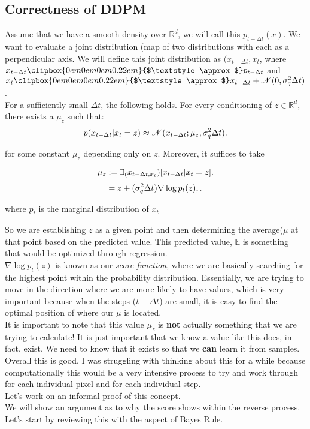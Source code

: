 \documentclass[10pt, oneside]{report}
\newcommand{\halfapprox}{\mathchoice{%
\clipbox{0em 0em 0em 0.22em}{$\displaystyle\approx$}}{%
\clipbox{0em 0em 0em 0.22em}{$\textstyle\approx$}}{%
\clipbox{0em 0em 0em 0.18em}{$\scriptstyle\approx$}}{%
\clipbox{0em 0em 0em 0.18em}{$\scriptscriptstyle\approx$}}}
\newcommand{\R}{\mathbb{R}}
\newcommand{\E}{\mathbb{E}}
\begin{document}
\subsection{Correctness of DDPM}
Assume that we have a smooth density over $\R^d$, we will call this $p_{t-\Delta t}(x)$.  We want to evaluate a joint distribution (map of two distributions with each as a perpendicular axis. We will define this joint distribution as $(x_{t-\Delta t}, x_t$, where $x_{t-\Delta t} \halfapprox p_{t-\Delta t}$ and $x_t \halfapprox x_{t-\Delta t} + \mathcal{N}(0, \sigma^2_q \Delta t)$.\\
For a sufficiently small $\Delta t$, the following holds. For every conditioning of $z \in \R^d$, there exists a $\mu_z$ such that:
\[
	p(x_{t-\Delta t} | x_t = z) \approx \mathcal{N}(x_{t-\Delta t}; \mu_z, \sigma^2_q \Delta t)\\
.\]
\begin{center}
    
	for some constant $\mu_z$ depending only on $z$.  Moreover, it suffices to take \\
\end{center}
\[
	\mu_z := \exists_(x_{t-\Delta t, x_t}) [x_{t-\Delta t} | x_t = z] \\
.\]
\[
	= z + (\sigma^2_q \Delta t) \nabla \log p_t (z), \\
.\]
\begin{center}
	where $p_t$ is the marginal distribution of $x_t$\\
\end{center}
So we are establishing $z$ as a given point and then determining the average($\mu$ at that point based on the predicted value.  This predicted value, $\E$ is something that would be optimized through regression.\\
$\nabla \log p_t (z)$ is known as our \textit{score function}, where we are basically searching for the highest point within the probability distribution.  Essentially, we are trying to move in the direction where we are more likely to have values, which is very important because when the steps ($t-\Delta t$) are small, it is easy to find the optimal position of where our $\mu$ is located.\\
It is important to note that this value $\mu_z$ is \textbf{not} actually something that we are trying to calculate! It is just important that we know a value like this does, in fact, exist.  We need to know that it exists so that we \textbf{can} learn it from samples.\\ 
Overall this is good, I was struggling with thinking about this for a while because computationally this would be a very intensive process to try and work through for each individual pixel and for each individual step. \\
Let's work on an informal proof of this concept. \\
We will show an argument as to why the score shows within the reverse process.  Let's start by reviewing this with the aspect of Bayes Rule.  
\end{document}
